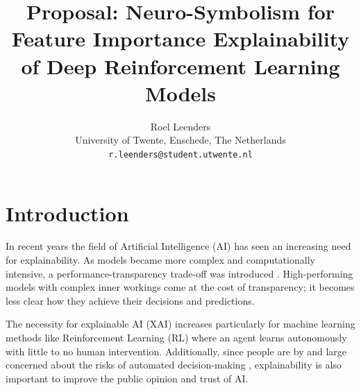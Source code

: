 \documentclass[11pt]{article}
\title{Proposal: Neuro-Symbolism for Feature Importance Explainability of Deep Reinforcement Learning Models}
\author{Roel Leenders \\
  University of Twente, Enschede, The Netherlands \\
  \texttt{r.leenders@student.utwente.nl}}
\begin{document}
\maketitle
\section{Introduction}


In recent years the field of Artificial Intelligence (AI) has seen an increasing need for explainability. As models became more 
complex and computationally intensive, a performance-transparency trade-off was introduced \cite{Puiutta2020}. High-performing 
models with complex inner workings come at the cost of transparency; it becomes less clear how they achieve their decisions and 
predictions. 

The necessity for explainable AI (XAI) increases particularly for machine learning methods like Reinforcement Learning (RL)
where an agent learns autonomously with little to no human intervention. Additionally, since people are by and large concerned
about the risks of automated decision-making \cite{Araujo2020}, explainability is also important to improve the public opinion and trust of AI.

\end{document}

